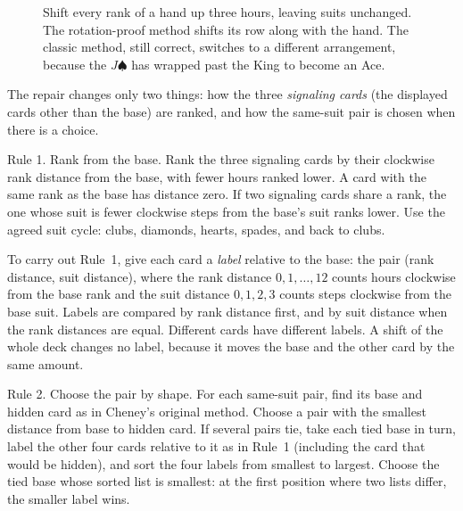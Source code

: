 \documentclass[11pt]{article}
\newcommand{\cl}{\ensuremath{\clubsuit}}
\newcommand{\di}{\textcolor{red!80!black}{\ensuremath{\diamondsuit}}}
\newcommand{\he}{\textcolor{red!80!black}{\ensuremath{\heartsuit}}}
\newcommand{\spd}{\ensuremath{\spadesuit}}
\newcommand{\cardat}[5]{%
  \begin{scope}[shift={(#1,#2)}]
    \draw[rounded corners=2.5pt,fill=white,line width=0.6pt] (-.38,-.55) rectangle (.38,.55);
    \node[font=\footnotesize\bfseries,text=#5] at (-.17,.32) {#3};
    \node[font=\Large,text=#5] at (.06,-.14) {$#4$};
  \end{scope}}
\begin{document}
\begin{figure}[ht]
\caption{Shift every rank of a hand up three hours, leaving suits
unchanged. The rotation-proof method shifts its row along with the
hand. The classic method, still correct, switches to a different
arrangement, because the $J\spd$ has wrapped past the King to become
an Ace.}
\label{fig:shift}
\end{figure}



The repair changes only two things: how the three \emph{signaling cards} (the displayed cards other than the base) are ranked, and how the same-suit pair is chosen when there is a choice.

\begin{rulebox}{Rule 1. Rank from the base.}
Rank the three signaling cards by their clockwise rank distance from the base, with fewer hours ranked lower. A card with the same rank as the base has distance zero. If two signaling cards share a rank, the one whose suit is fewer clockwise steps from the base's suit ranks lower. Use the agreed suit cycle: clubs, diamonds, hearts, spades, and back to clubs.
\end{rulebox}

To carry out Rule~1, give each card a \emph{label} relative to the base: the pair (rank distance, suit distance), where the rank distance $0,1,\ldots,12$ counts hours clockwise from the base rank and the suit distance $0,1,2,3$ counts steps clockwise from the base suit. Labels are compared by rank distance first, and by suit distance when the rank distances are equal. Different cards have different labels. A shift of the whole deck changes no label, because it moves the base and the other card by the same amount.


\begin{rulebox}{Rule 2. Choose the pair by shape.}
For each same-suit pair, find its base and hidden card as in Cheney's original method. Choose a pair with the smallest distance from base to hidden card. If several pairs tie, take each tied base in turn, label the other four cards relative to it as in Rule~1 (including the card that would be hidden), and sort the four labels from smallest to largest. Choose the tied base whose sorted list is smallest: at the first position where two lists differ, the smaller label wins.
\end{rulebox}
\end{document}
